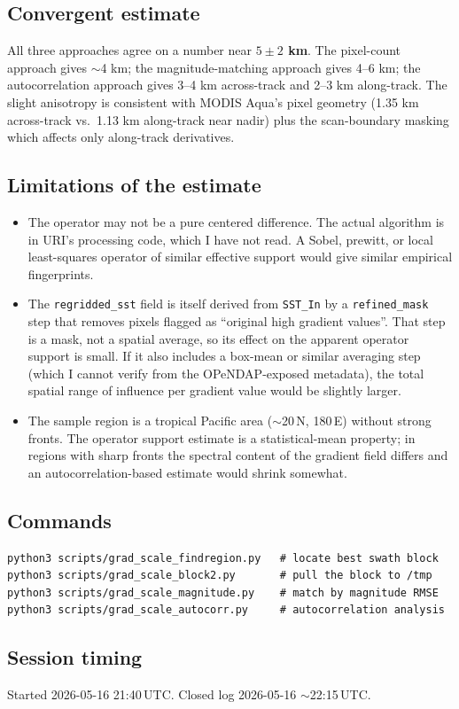 \documentclass[11pt]{article}
\begin{document}
\subsection{Convergent estimate}

All three approaches agree on a number near
\textbf{$5\pm 2$ km}. The pixel-count approach gives $\sim$4 km;
the magnitude-matching approach gives 4--6 km; the
autocorrelation approach gives 3--4 km across-track and 2--3 km
along-track. The slight anisotropy is consistent with MODIS
Aqua's pixel geometry (1.35 km across-track vs.\ 1.13 km
along-track near nadir) plus the scan-boundary masking which
affects only along-track derivatives.

\subsection{Limitations of the estimate}

\begin{itemize}
  \item The operator may not be a pure centered difference. The
    actual algorithm is in URI's processing code, which I have
    not read. A Sobel, prewitt, or local least-squares operator
    of similar effective support would give similar empirical
    fingerprints.
  \item The \texttt{regridded\_sst} field is itself derived from
    \texttt{SST\_In} by a \texttt{refined\_mask} step that removes
    pixels flagged as ``original high gradient values''. That step
    is a mask, not a spatial average, so its effect on the
    apparent operator support is small. If it also includes a
    box-mean or similar averaging step (which I cannot verify from
    the OPeNDAP-exposed metadata), the total spatial range of
    influence per gradient value would be slightly larger.
  \item The sample region is a tropical Pacific area
    ($\sim$20\,N, 180\,E) without strong fronts. The operator
    support estimate is a statistical-mean property; in regions
    with sharp fronts the spectral content of the gradient field
    differs and an autocorrelation-based estimate would shrink
    somewhat.
\end{itemize}

\subsection{Commands}

\begin{lstlisting}
python3 scripts/grad_scale_findregion.py   # locate best swath block
python3 scripts/grad_scale_block2.py       # pull the block to /tmp
python3 scripts/grad_scale_magnitude.py    # match by magnitude RMSE
python3 scripts/grad_scale_autocorr.py     # autocorrelation analysis
\end{lstlisting}

\subsection{Session timing}

Started 2026-05-16 21:40\,UTC. Closed log 2026-05-16
$\sim$22:15\,UTC.
\end{document}

